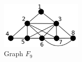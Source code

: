 \begin{figure}[htb]	
 \center%
 \includegraphics[width=4cm]{./img/f9.png}
 \caption{Graph $F_{9}$}
\label{fig:f9}
\end{figure}  
 